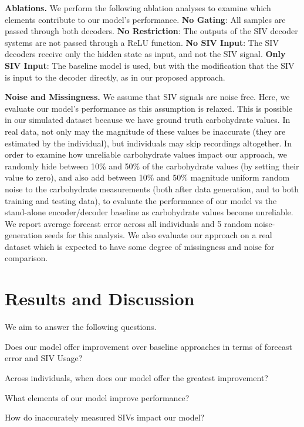 \documentclass[letterpaper]{article}
\begin{document}
\textbf{Ablations.}  We perform the following ablation analyses to examine which elements contribute to our model's performance. \textbf{No Gating}: All samples are passed through both decoders. \textbf{No Restriction}: The outputs of the SIV decoder systems are not passed through a ReLU function. \textbf{No SIV Input}: The SIV decoders receive only the hidden state as input, and not the SIV signal. \textbf{Only SIV Input}: The baseline model is used, but with the modification that the SIV is input to the decoder directly, as in our proposed approach.

\textbf{Noise and Missingness.} We assume that SIV signals are noise free. Here, we evaluate our model's performance as this assumption is relaxed. This is possible in our simulated dataset because we have ground truth carbohydrate values. In real data, not only may the magnitude of these values be inaccurate (they are estimated by the individual), but individuals may skip recordings altogether. In order to examine how unreliable carbohydrate values impact our approach, we randomly hide between 10\% and 50\% of the carbohydrate values (by setting their value to zero), and also add between 10\% and 50\% magnitude uniform random noise to the carbohydrate measurements (both after data generation, and to both training and testing data), to evaluate the performance of our model vs the stand-alone encoder/decoder baseline as carbohydrate values become unreliable. We report average forecast error across all individuals and 5 random noise-generation seeds for this analysis. We also evaluate our approach on a real dataset which is expected to have some degree of missingness and noise for comparison.






\section{Results and Discussion}





 We aim to answer the following questions.

     Does our model offer improvement over baseline approaches in terms of forecast error and SIV Usage?

     Across individuals, when does our model offer the greatest improvement?

     What elements of our model improve performance?

     How do inaccurately measured SIVs impact our model?
\end{document}
